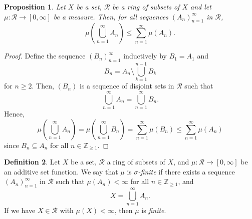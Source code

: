 \documentclass[a4paper, openany]{memoir}
\theoremstyle{definition}
\newtheorem{definition}{Definition}[section]
\theoremstyle{plain}
\newtheorem{proposition}[definition]{Proposition}
\begin{document}
    \begin{proposition}
        Let $X$ be a set, $\mathcal{R}$ be a ring of subsets of $X$ and let $\mu \colon \mathcal{R} \to [0, \infty]$ be a measure. Then, for all sequences $(A_n)_{n=1}^\infty$ in $\mathcal{R}$,
        \[\mu \left(\bigcup_{n=1}^\infty A_n\right) \leq \sum_{n=1}^\infty \mu(A_n).\]
    \end{proposition}
    \begin{proof}
        Define the sequence $(B_n)_{n=1}^\infty$ inductively by $B_1 = A_1$ and 
        \[B_n = A_n \setminus \bigcup_{k=1}^{n-1} B_k\]
        for $n \geq 2$. Then, $(B_n)$ is a sequence of disjoint sets in $\mathcal{R}$ such that 
        \[\bigcup_{n=1}^\infty A_n = \bigcup_{n=1}^\infty B_n.\]
        Hence,
        \[\mu \left(\bigcup_{n=1}^\infty A_n\right) = \mu \left(\bigcup_{n=1}^\infty B_n\right) = \sum_{n=1}^\infty \mu(B_n) \leq \sum_{n=1}^\infty \mu(A_n)\]
        since $B_n \subseteq A_n$ for all $n \in \mathbb{Z}_{\geq 1}$.
    \end{proof}

    \begin{definition}
        Let $X$ be a set, $\mathcal{R}$ a ring of subsets of $X$, and $\mu \colon \mathcal{R} \to [0, \infty]$ be an additive set function. We say that $\mu$ is \emph{$\sigma$-finite} if there exists a sequence $(A_n)_{n=1}^\infty$ in $\mathcal{R}$ such that $\mu(A_n) < \infty$ for all $n \in \mathbb{Z}_{\geq 1}$, and
        \[X = \bigcup_{n=1}^\infty A_n.\]
        If we have $X \in \mathcal{R}$ with $\mu(X) < \infty$, then $\mu$ is \emph{finite}.
    \end{definition}
\end{document}
